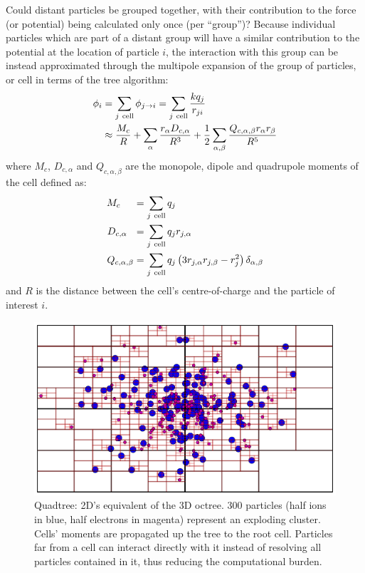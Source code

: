Could distant particles be grouped together, with their contribution to the
force (or potential) being calculated only once (per ``group'')? Because
individual particles which are part of a distant group will have a similar
contribution to the potential at the location of particle $i$, the interaction
with this group can be instead approximated through the multipole
expansion\cite{Gibbon2002} of the group of particles, or cell in terms of the
tree algorithm:
\begin{align}
\phi_i & = \sum_{j~\textrm{cell}} \phi_{j \rightarrow i} = \sum_{j~{\rm cell}}
\frac{k q_j}{r_{ji}} \\
& \approx \frac{M_{c}}{R}
+ \sum_{\alpha} \frac{r_{\alpha} D_{c,\alpha}}{R^3}
+ \frac{1}{2} \sum_{\alpha,\beta} \frac{
        Q_{c,\alpha,\beta} r_{\alpha} r_{\beta}
    }{R^5}
\end{align}
where $M_{c}$, $D_{c,\alpha}$ and $Q_{c,\alpha,\beta}$ are the monopole, dipole
and quadrupole moments of the cell defined as:
\begin{subequations}
\begin{align}
M_{c}           ~~~~& = \sum_{j~\textrm{cell}} q_{j} \\
D_{c,\alpha}      ~~& = \sum_{j~\textrm{cell}} q_{j} r_{j,\alpha} \\
Q_{c,\alpha,\beta}  & = \sum_{j~\textrm{cell}} q_{j} \left( 3 r_{j,\alpha}
r_{j,\beta} - r_{j}^2 \right) \delta_{\alpha,\beta}
\end{align}
\label{eqn:tree:moments}
\end{subequations}
and $R$ is the distance between the cell's centre-of-charge and the
particle of interest $i$.

\begin{figure}
 \centering
 \includegraphics[width=\figurewidth]{figures/quadtree}
 \caption{\label{fig:tree:quadtree}Quadtree: 2D's equivalent of the 3D octree.
          300 particles (half ions in blue, half electrons in magenta) represent
          an exploding cluster. Cells' moments are propagated up the tree to the
          root cell. Particles far from a cell can interact directly with it
          instead of resolving all particles contained in it, thus reducing the
          computational burden.}
\end{figure}


